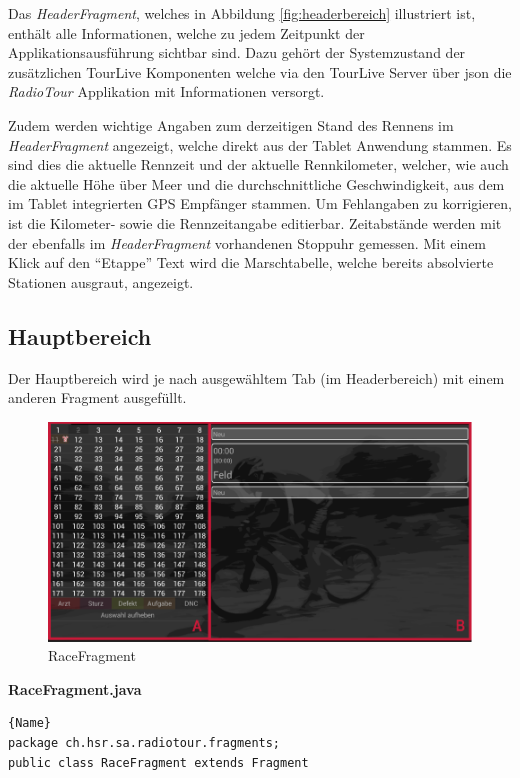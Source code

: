 Das \textit{HeaderFragment}, welches in Abbildung \ref{fig:headerbereich} illustriert ist, enthält alle Informationen, welche zu jedem Zeitpunkt der Applikationsausführung sichtbar sind. Dazu gehört der Systemzustand der zusätzlichen TourLive Komponenten welche via den TourLive Server über \gls{json} die \textit{RadioTour} Applikation mit Informationen versorgt.

Zudem werden wichtige Angaben zum derzeitigen Stand des Rennens im \textit{HeaderFragment} angezeigt, welche direkt aus der Tablet Anwendung stammen. Es sind dies die aktuelle Rennzeit und der aktuelle Rennkilometer, welcher, wie auch die aktuelle Höhe über Meer und die durchschnittliche Geschwindigkeit, aus dem im Tablet integrierten GPS Empfänger stammen. Um Fehlangaben zu korrigieren, ist die Kilometer- sowie die Rennzeitangabe editierbar.
Zeitabstände werden mit der ebenfalls im \textit{HeaderFragment} vorhandenen Stoppuhr gemessen. 
Mit einem Klick auf den "`Etappe"' Text wird die Marschtabelle, welche bereits absolvierte Stationen ausgraut, angezeigt.

\subsection{Hauptbereich}
Der Hauptbereich wird je nach ausgewähltem Tab (im Headerbereich) mit einem anderen Fragment ausgefüllt.
\\

\begin{figure}[h!]
\caption{RaceFragment}
\label{fig:racefragment}
\centering
\includegraphics[scale=0.8]{07anhang/images/dev_racefragment.png}
\end{figure}


\textbf{RaceFragment.java}
\begin{lstlisting}{Name}
package ch.hsr.sa.radiotour.fragments;
public class RaceFragment extends Fragment 
\end{lstlisting}


